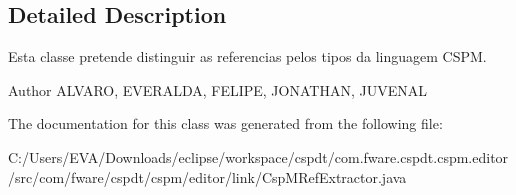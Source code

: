 \subsection{Detailed Description}
Esta classe pretende distinguir as referencias pelos tipos da linguagem C\+S\+PM. 

\begin{DoxyAuthor}{Author}
A\+L\+V\+A\+RO, E\+V\+E\+R\+A\+L\+DA, F\+E\+L\+I\+PE, J\+O\+N\+A\+T\+H\+AN, J\+U\+V\+E\+N\+AL 
\end{DoxyAuthor}


The documentation for this class was generated from the following file\+:\begin{DoxyCompactItemize}
\item 
C\+:/\+Users/\+E\+V\+A/\+Downloads/eclipse/workspace/cspdt/com.\+fware.\+cspdt.\+cspm.\+editor/src/com/fware/cspdt/cspm/editor/link/Csp\+M\+Ref\+Extractor.\+java\end{DoxyCompactItemize}
